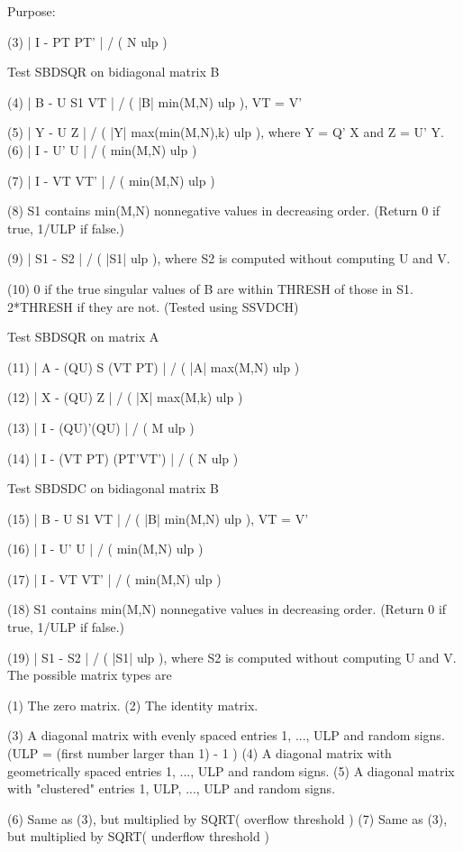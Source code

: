 \begin{DoxyParagraph}{Purpose\+: }
\begin{DoxyVerb}
 (3)   | I - PT PT' | / ( N ulp )

 Test SBDSQR on bidiagonal matrix B

 (4)   | B - U S1 VT | / ( |B| min(M,N) ulp ), VT = V'

 (5)   | Y - U Z | / ( |Y| max(min(M,N),k) ulp ), where Y = Q' X
                                                  and   Z = U' Y.
 (6)   | I - U' U | / ( min(M,N) ulp )

 (7)   | I - VT VT' | / ( min(M,N) ulp )

 (8)   S1 contains min(M,N) nonnegative values in decreasing order.
       (Return 0 if true, 1/ULP if false.)

 (9)   | S1 - S2 | / ( |S1| ulp ), where S2 is computed without
                                   computing U and V.

 (10)  0 if the true singular values of B are within THRESH of
       those in S1.  2*THRESH if they are not.  (Tested using
       SSVDCH)

 Test SBDSQR on matrix A

 (11)  | A - (QU) S (VT PT) | / ( |A| max(M,N) ulp )

 (12)  | X - (QU) Z | / ( |X| max(M,k) ulp )

 (13)  | I - (QU)'(QU) | / ( M ulp )

 (14)  | I - (VT PT) (PT'VT') | / ( N ulp )

 Test SBDSDC on bidiagonal matrix B

 (15)  | B - U S1 VT | / ( |B| min(M,N) ulp ), VT = V'

 (16)  | I - U' U | / ( min(M,N) ulp )

 (17)  | I - VT VT' | / ( min(M,N) ulp )

 (18)  S1 contains min(M,N) nonnegative values in decreasing order.
       (Return 0 if true, 1/ULP if false.)

 (19)  | S1 - S2 | / ( |S1| ulp ), where S2 is computed without
                                   computing U and V.
 The possible matrix types are

 (1)  The zero matrix.
 (2)  The identity matrix.

 (3)  A diagonal matrix with evenly spaced entries
      1, ..., ULP  and random signs.
      (ULP = (first number larger than 1) - 1 )
 (4)  A diagonal matrix with geometrically spaced entries
      1, ..., ULP  and random signs.
 (5)  A diagonal matrix with "clustered" entries 1, ULP, ..., ULP
      and random signs.

 (6)  Same as (3), but multiplied by SQRT( overflow threshold )
 (7)  Same as (3), but multiplied by SQRT( underflow threshold )


\end{DoxyVerb}
\end{DoxyParagraph}
